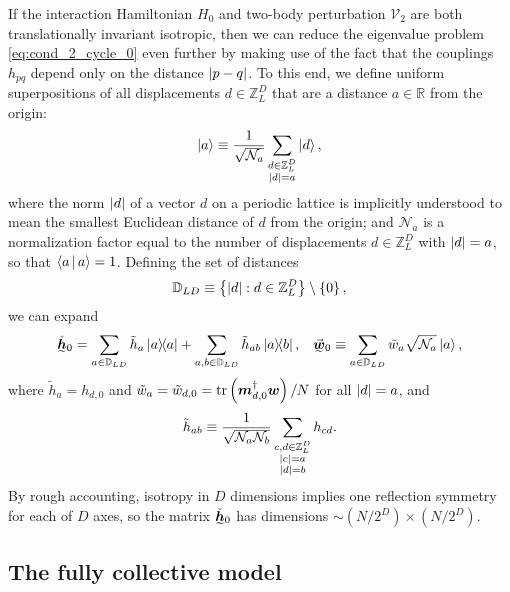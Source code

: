 \documentclass[nofootinbib,notitlepage,11pt]{revtex4-2}
\newcommand{\f}[2]{\dfrac{#1}{#2}} %
\newcommand{\p}[1]{\left(#1\right)} %
\renewcommand{\set}[1]{\left\{#1\right\}} %
\newcommand{\bk}{\Braket} %
\newcommand{\m}{\bm} %
\renewcommand{\v}{\vec} %
\newcommand{\1}{\mathds{1}}
\newcommand{\N}{\mathcal{N}}
\newcommand{\V}{\mathcal{V}}
\newcommand{\DD}{\mathbb{D}}
\newcommand{\RR}{\mathbb{R}}
\newcommand{\ZZ}{\mathbb{Z}}
\newcommand{\ut}{\undertilde}
\begin{document}
If the interaction Hamiltonian $H_0$ and two-body perturbation $\V_2$
are both translationally invariant isotropic, then we can reduce the
eigenvalue problem \eqref{eq:cond_2_cycle_0} even further by making
use of the fact that the couplings $h_{pq}$ depend only on the
distance $\abs{p-q}$.  To this end, we define uniform superpositions
of all displacements $d\in\ZZ_L^D$ that are a distance $a\in\RR$ from
the origin:
\begin{align}
  \ket{a} \equiv \f1{\sqrt{\N_a}}
  \sum_{\substack{d\in\ZZ_L^D\\\abs{d}=a}} \ket{d},
\end{align}
where the norm $\abs{d}$ of a vector $d$ on a periodic lattice is
implicitly understood to mean the smallest Euclidean distance of $d$
from the origin; and $\N_a$ is a normalization factor equal to the
number of displacements $d\in\ZZ_L^D$ with $\abs{d}=a$, so that
$\bk{a|a}=1$.  Defining the set of distances
\begin{align}
  \DD_{LD} \equiv \set{ \abs{d} : d \in \ZZ_L^D } \setminus \set{0},
\end{align}
we can expand
\begin{align}
  \ut{\check{\m h}}_0
  = \sum_{a\in\DD_{LD}} \tilde h_a \op{a}
  + \sum_{a,b\in\DD_{LD}} \tilde h_{ab} \op{a}{b},
  &&
  \ut{\v{\m w}}_0
  \equiv \sum_{a\in\DD_{LD}} \tilde w_a \sqrt{\N_a} \ket{a},
\end{align}
where $\tilde h_a=h_{d,0}$ and
$\tilde w_a=\tilde w_{d,0}=\tr\p{\m m_{d,0}^\dag \m w}/N$ for all
$\abs{d}=a$, and
\begin{align}
  \tilde h_{ab} \equiv \f1{\sqrt{\N_a\N_b}}
  \sum_{\substack{c,d\in\ZZ_L^D\\\abs{c}=a\\\abs{d}=b}} h_{cd}.
\end{align}
By rough accounting, isotropy in $D$ dimensions implies one reflection
symmetry for each of $D$ axes, so the matrix $\ut{\check{\m h}}_0$ has
dimensions $\sim\p{N/2^D}\times\p{N/2^D}$.

\subsection{The fully collective model}
\end{document}

